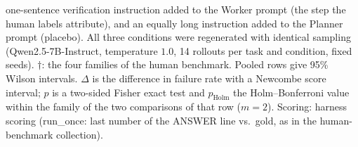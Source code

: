 \begin{table}[t]
{one-sentence verification instruction added to the Worker prompt (the step the human labels
attribute), and an equally long instruction added to the Planner prompt (placebo). All three
conditions were regenerated with identical sampling (Qwen2.5-7B-Instruct, temperature $1.0$,
14 rollouts per task and condition, fixed seeds).
$\dagger$: the four families of the human benchmark. Pooled rows give 95\% Wilson intervals.
$\Delta$ is the difference in failure rate with a Newcombe score interval; $p$ is a two-sided
Fisher exact test and $p_{\mathrm{Holm}}$ the Holm--Bonferroni value within the family of the two
comparisons of that row ($m{=}2$). Scoring: harness scoring (run\_once: last number of the ANSWER line vs.\ gold, as in the human-benchmark collection).}
\label{tab:intervention-qwen}
\end{table}

